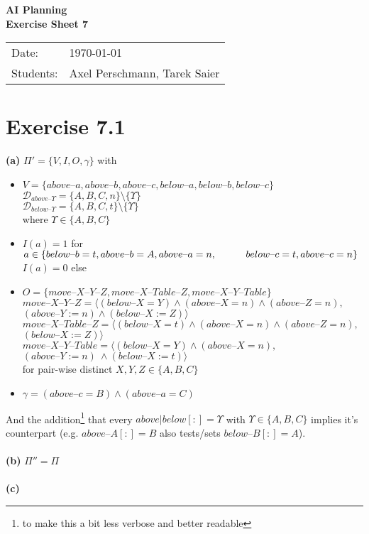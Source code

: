\documentclass[11pt,a4paper]{article}
\newcommand{\sheetNr}{7}
\newcommand{\h}[0]{\text{--}}
\begin{document}
\begin{center}
\Huge{\textbf{AI Planning}}\\
\LARGE{\textbf{Exercise Sheet \sheetNr}}
\end{center}
\vspace{2cm}
\begin{tabular}{ll}
Date: & \today\\
Students: & Axel Perschmann, Tarek Saier
\end{tabular}

\section*{Exercise 7.1}
\textbf{(a)} $\Pi'=\{V,I,O,\gamma\}$ with\\
\begin{itemize}
\item $V=\{above\h a,above\h b,above\h c,below\h a,below\h b,below\h c\}$\\
$\mathscr{D}_{above\h\Upsilon}=\{A,B,C,n\}\setminus\{\Upsilon\}$\\
$\mathscr{D}_{below\h\Upsilon}=\{A,B,C,t\}\setminus\{\Upsilon\}$\\
where $\Upsilon\in\{A,B,C\}$

\item $I(a)=1$ for $a\in \{below\h b=t,above\h b=A,above\h a=n,\\
\hphantom{wwww}below\h c=t,above\h c=n\}$\\
$I(a)=0$ else

\item $O=\{move\h X\h Y\h Z,move\h X\h Table\h Z,move\h X\h Y\h Table\}$\\
$move\h X\h Y\h Z=\langle (below\h X=Y) \land (above\h X=n) \land (above\h Z=n),$\\
\hphantom{wwww}$(above\h Y:=n) \land (below\h X:=Z) \rangle$\\
$move\h X\h Table\h Z=\langle(below\h X=t) \land (above\h X=n) \land (above\h Z=n),$\\
\hphantom{wwww}$(below\h X:=Z)\rangle$\\
$move\h X\h Y\h Table=\langle(below\h X=Y) \land (above\h X=n),$\\
\hphantom{wwww}$(above\h Y:=n)\ \land (below\h X:=t)\rangle$\\
for pair-wise distinct $X,Y,Z\in\{A,B,C\}$

\item $\gamma=(above\h c=B)\land(above\h a=C)$
\end{itemize}
And the addition\footnote{to make this a bit less verbose and better readable} that every $above|below[:]$$=\Upsilon$ with $\Upsilon\in\{A,B,C\}$ implies it's counterpart (e.g. $above\h A[:]$$=B$ also tests/sets $below\h B[:]$$=A$).\\
\\
\textbf{(b)} $\Pi''=\Pi$\\
\\
\textbf{(c)}
\newpage
\end{document}

